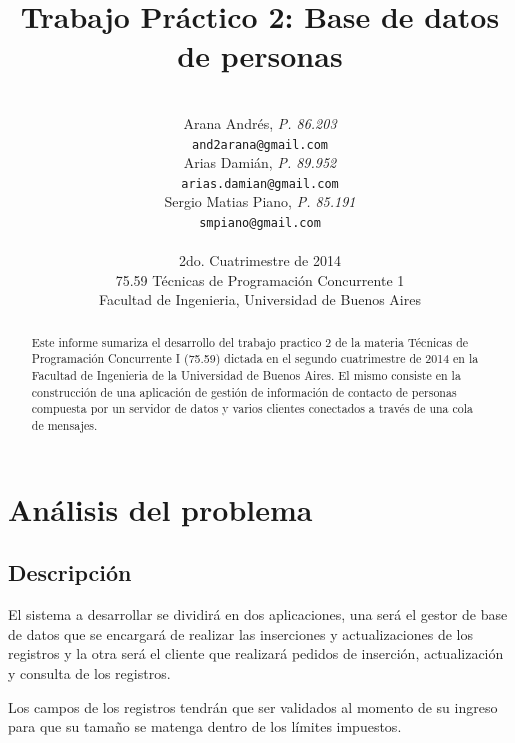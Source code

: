 \documentclass[a4paper,10pt]{article}
\title{\textbf{Trabajo Práctico 2: Base de datos de personas}}
\author{\\
  Arana Andrés, \textit{P. 86.203}                                 \\
  \texttt{and2arana@gmail.com}                                     \\ [2.5ex]
  Arias Damián, \textit{P. 89.952}                                 \\
  \texttt{arias.damian@gmail.com}                                  \\ [2.5ex]
  Sergio Matias Piano, \textit{P. 85.191}                          \\
  \texttt{smpiano@gmail.com}                                       \\ [2.5ex]
                                                                   \\
  \normalsize{2do. Cuatrimestre de 2014}                           \\
  \normalsize{75.59 Técnicas de Programación Concurrente 1}        \\
  \normalsize{Facultad de Ingenieria, Universidad de Buenos Aires} \\
}
\date{}
\begin{document}
\thispagestyle{empty}
\maketitle

\begin{abstract}

  Este informe sumariza el desarrollo del trabajo practico 2 de la materia
  Técnicas de Programación Concurrente I (75.59) dictada en el segundo
  cuatrimestre de 2014 en la Facultad de Ingenieria de la Universidad de Buenos
  Aires. El mismo consiste en la construcción de una aplicación de gestión de
  información de contacto de personas compuesta por un servidor de datos y
  varios clientes conectados a través de una cola de mensajes.

\end{abstract}

\clearpage

\tableofcontents
\clearpage




\section{Análisis del problema}

\subsection{Descripción}

El sistema a desarrollar se dividirá en dos aplicaciones, una será el gestor de base de datos que se encargará de realizar las inserciones y actualizaciones de los registros y la otra será el cliente que realizará pedidos de inserción, actualización y consulta de los registros.

Los campos de los registros tendrán que ser validados al momento de su ingreso para que su tamaño se matenga dentro de los límites impuestos.
\end{document}
